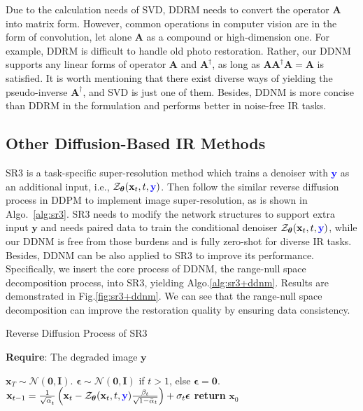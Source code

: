\documentclass{article} \usepackage{iclr2023_conference,times}
\begin{document}
Due to the calculation needs of SVD, DDRM needs to convert the operator $\mathbf{A}$ into matrix form. However, common operations in computer vision are in the form of convolution, let alone $\mathbf{A}$ as a compound or high-dimension one. For example, DDRM is difficult to handle old photo restoration. Rather, our DDNM supports any linear forms of operator $\mathbf{A}$ and $\mathbf{A}^{\dagger}$, as long as $\mathbf{A}\mathbf{A}^{\dagger}\mathbf{A}=\mathbf{A}$ is satisfied. It is worth mentioning that there exist diverse ways of yielding the pseudo-inverse $\mathbf{A}^{\dagger}$, and SVD is just one of them. Besides, DDNM is more concise than DDRM in the formulation and performs better in noise-free IR tasks. 


\subsection{Other Diffusion-Based IR Methods}
SR3 \citep{sr3} is a task-specific super-resolution method which trains a denoiser with \textcolor{blue}{$\mathbf{y}$} as an additional input, i.e., $\mathcal{Z}_{\boldsymbol{\theta}}(\mathbf{x}_{t},t,\textcolor{blue}{\mathbf{y}})$. Then follow the similar reverse diffusion process in DDPM \citep{ho2020denoising} to implement image super-resolution, as is shown in Algo.~\ref{alg:sr3}. SR3 needs to modify the network structures to support extra input $\mathbf{y}$ and needs paired data to train the conditional denoiser $\mathcal{Z}_{\boldsymbol{\theta}}(\mathbf{x}_{t},t,\textcolor{blue}{\mathbf{y}})$, while our DDNM is free from those burdens and is fully zero-shot for diverse IR tasks. Besides, DDNM can be also applied to SR3 to improve its performance. Specifically, we insert the core process of DDNM, the range-null space decomposition process, into SR3, yielding Algo.\ref{alg:sr3+ddnm}. Results are demonstrated in Fig.\ref{fig:sr3+ddnm}. We can see that the range-null space decomposition can improve the restoration quality by ensuring data consistency.

\begin{algorithm}[h]
\caption{Reverse Diffusion Process of SR3}
\label{alg:sr3}
\textbf{Require}: The degraded image $\mathbf{y}$
\begin{algorithmic}[1] \State $\mathbf{x}_{T}\sim\mathcal{N}(\mathbf{0},\mathbf{I})$.
\State $\boldsymbol{\epsilon}\sim\mathcal{N}(\mathbf{0},\mathbf{I})$ if $t>1$, else $\boldsymbol{\epsilon}=\mathbf{0}$.
\State $\mathbf{x}_{t-1} = \frac{1}{\sqrt{\alpha}_{t}}	\left( \mathbf{x}_{t} - \mathcal{Z}_{\boldsymbol{\theta}}(\mathbf{x}_{t},t,\textcolor{blue}{\mathbf{y}})\frac{\beta_{t}}{\sqrt{1-\Bar{\alpha}_{t}}} \right) +\sigma_{t}\boldsymbol{\epsilon}$
\EndFor
\State \textbf{return} $\mathbf{x}_{0}$
\end{algorithmic}
\end{algorithm}
\end{document}
